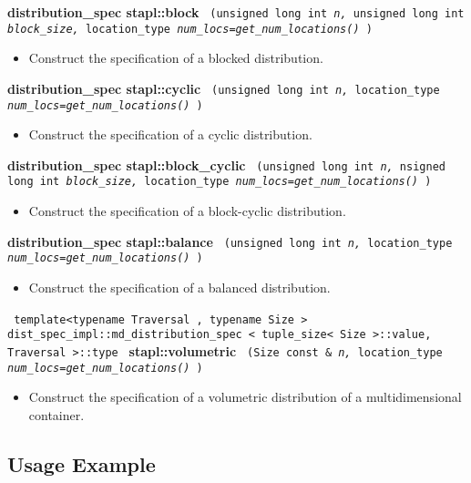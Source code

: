 \noindent
\textbf{distribution\_spec stapl::block}%
\texttt{%
(unsigned long int
\textit{n,}%
unsigned long int
\textit{block\_size,}%
location\_type
\textit{num\_locs=get\_num\_locations()}%
)
}

\begin{itemize}
\item
Construct the specification of a blocked distribution.
\end{itemize}

\noindent
\textbf{distribution\_spec stapl::cyclic}%
\texttt{%
(unsigned long int
\textit{n,}%
location\_type
\textit{num\_locs=get\_num\_locations()}%
)
}

\begin{itemize}
\item
Construct the specification of a cyclic distribution.
\end{itemize}

\noindent
\textbf{distribution\_spec stapl::block\_cyclic}%
\texttt{%
(unsigned long int
\textit{n,}%
nsigned long int
\textit{block\_size,}%
location\_type
\textit{num\_locs=get\_num\_locations()}%
)
}

\begin{itemize}
\item
Construct the specification of a block-cyclic distribution.
\end{itemize}

\noindent
\textbf{distribution\_spec stapl::balance}%
\texttt{%
(unsigned long int
\textit{n,}%
location\_type
\textit{num\_locs=get\_num\_locations()}%
)
}

\begin{itemize}
\item
Construct the specification of a balanced distribution.
\end{itemize}

\noindent
\texttt{%
template<typename Traversal , typename Size >
}
\texttt{%
dist\_spec\_impl::md\_distribution\_spec < tuple\_size< Size >::value,
Traversal >::type
}
\newline
\textbf{stapl::volumetric}%
\texttt{%
(Size const \&
\textit{n,}%
location\_type
\textit{num\_locs=get\_num\_locations()}%
)
}

\begin{itemize}
\item
Construct the specification of a volumetric distribution of a multidimensional container.
\end{itemize}

\subsection{Usage Example} \label{sec-dist-spec-vw-use}

